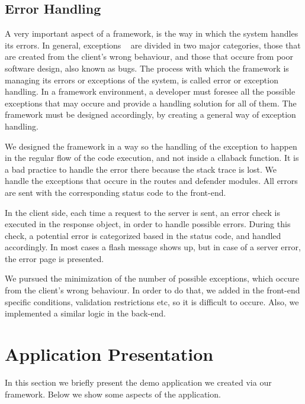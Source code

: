 \subsection{Error Handling}
\label{errorHandling}
A very important aspect of a framework, is the way in which the system handles its errors. In general, exceptions ~\cite{carlson2000method} are divided in two major categories, those that are created from the client's wrong behaviour, and those that occure from poor software design, also known as bugs. The process with which the framework is managing its errors or exceptions of the system, is called error or exception handling. In a framework environment, a developer must foresee all the possible exceptions that may occure and provide a handling solution for all of them. The framework must be designed accordingly, by creating a general way of exception handling. \par
	We designed the framework in a way so the handling of the exception to happen in the regular flow of the code execution, and not inside a cllaback function. It is a bad practice to handle the error there because the stack trace is lost. We handle the exceptions that occure in the routes and defender modules. All errors are sent with the corresponding status code to the front-end. \par 
	In the client side, each time a request to the server is sent, an error check is executed in the response object, in order to handle possible errors. During this check, a potential error is categorized based in the status code, and handled accordingly. In most cases a flash message shows up, but in case of a server error, the error page is presented. \par 
	We pursued the minimization of the number of possible exceptions, which occure from the client's wrong behaviour. In order to do that, we added in the front-end specific conditions, validation restrictions etc, so it is difficult to occure. Also, we implemented a similar logic in the back-end.


\section{Application Presentation}
In this section we briefly present the demo application we created via our framework. Below we show some aspects of the application.

